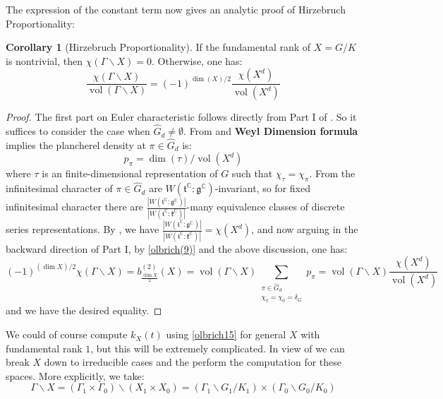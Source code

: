 \documentclass[11pt]{report}
\theoremstyle{definition}
\newtheorem{Cor}[Def]{Corollary}
\theoremstyle{plain}
\DeclareMathOperator{\vol}{vol}
\newcommand{\complex}{\mathbb{C}}
\renewcommand{\hat}{\widehat}
\newcommand{\Lie}[1]{\mathfrak{#1}}
\begin{document}
The expression of the constant term now gives an analytic proof of Hirzebruch Proportionality:
\begin{Cor}[Hirzebruch Proportionality]\label{hirzebruch}
	If the fundamental rank of $X=G/K$ is nontrivial, then $\chi(\Gamma\backslash X)=0$. Otherwise, one has:
	\begin{equation}
	\frac{\chi(\Gamma\backslash X)}{\vol(\Gamma\backslash X)}=(-1)^{\dim(X)/2}\frac{\chi(X^d)}{\vol(X^d)}
	\end{equation}
\end{Cor}
\begin{proof}
	The first part on Euler characteristic follows directly from Part I of . So it suffices to consider the case when $\hat{G}_d\neq \emptyset$. From  and \textbf{Weyl Dimension formula} implies the plancherel density at $\pi\in \hat{G}_d$ is:
	\begin{equation}
	p_\pi=\dim(\tau)/\vol(X^d)
	\end{equation}
	where $\tau$ is an finite-dimensional representation of $G$ such that $\chi_{\tau}=\chi_\pi$. From  the infinitesimal character of $\pi\in \hat{G}_d$ are $W(\Lie{t}^\complex:\Lie{g}^\complex)$-invariant, so for fixed infinitesimal character there are $\frac{|W(\Lie{t}^\complex:\Lie{g}^\complex)|}{|W(\Lie{t}^\complex:\Lie{k}^\complex)|}$-many equivalence classes of discrete series representations. By \cite[Page~175]{bott1965}, we have $\frac{|W(\Lie{t}^\complex:\Lie{g}^\complex)|}{|W(\Lie{t}^\complex:\Lie{k}^\complex)|}=\chi(X^d)$, and now arguing in the backward direction of Part I, by \ref{olbrich(9)} and the above discussion, one has:
	\begin{equation}
	(-1)^{(\dim X)/2}\chi(\Gamma\backslash X)=b^{(2)}_{\frac{\dim X}{2}}(X)=\vol(\Gamma\backslash X)\sum_{\substack{\pi\in \hat{G}_d\\ \chi_{\pi}=\chi_{0}=\delta_G}}p_\pi=\vol(\Gamma\backslash X)\frac{\chi(X^d)}{\vol(X^d)}
	\end{equation}
	and we have the desired equality.
\end{proof}
We could of course compute $k_X(t)$ using \ref{olbrich15} for general $X$ with fundamental rank $1$, but this will be extremely complicated. In view of  we can break $X$ down to irreducible cases and the perform the computation for these spaces. More explicitly, we take:
\begin{equation*}
\Gamma\backslash X=(\Gamma_1\times \Gamma_0)\backslash (X_1\times X_0)=(\Gamma_1\backslash G_1/K_1)\times (\Gamma_0\backslash G_0/K_0)
\end{equation*}
\end{document}
